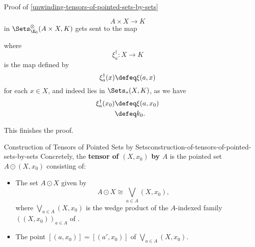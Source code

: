 \begin{Proof}{Proof of \cref{unwinding-tensors-of-pointed-sets-by-sets}}
\begin{itemize}
\[                A\times X%
                \to%
                K%
            \]%
            in $\Sets^{\otimes}_{\E_{0}}(A\times X,K)$ gets sent to the map
            \begin{webcompile}
                \phantom{\xi^{\dagger}\colon}
            \end{webcompile}
            where
            \[
                \xi^{\dagger}_{a}%
                \colon%
                X
                \to%
                K%
            \]%
            is the map defined by
            \[
                \xi^{\dagger}_{a}(x)%
                \defeq%
                \xi(a,x)%
            \]%
            for each $x\in X$, and indeed lies in $\Sets_{*}(X,K)$, as we have%
            \begin{align*}
                \xi^{\dagger}_{a}(x_{0}) &\defeq \xi(a,x_{0})\\%
                                         &\defeq k_{0}.%
            \end{align*}
    \end{itemize}
    This finishes the proof.
\end{Proof}
\begin{construction}{Construction of Tensors of Pointed Sets by Sets}{construction-of-tensors-of-pointed-sets-by-sets}%
    Concretely, the \textbf{tensor of $(X,x_{0})$ by $A$} is the pointed set $A\odot(X,x_{0})$ consisting of:
    \begin{itemize}
        \item{}The set $A\odot X$ given by
            \[
                A\odot X%
                \cong%
                \bigvee_{a\in A}(X,x_{0}),%
            \]%
            where $\bigvee_{a\in A}(X,x_{0})$ is the wedge product of the $A$-indexed family $((X,x_{0}))_{a\in A}$ of .
        \item{}The point $[(a,x_{0})]=[(a',x_{0})]$ of $\bigvee_{a\in A}(X,x_{0})$.%
    \end{itemize}
\end{construction}
